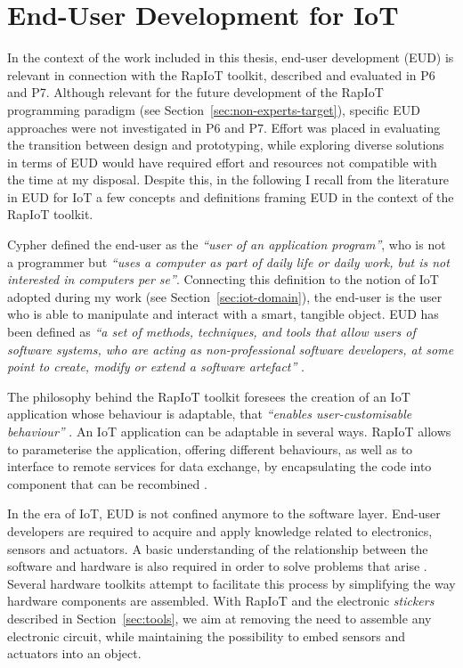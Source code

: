\section{End-User Development for IoT}

In the context of the work included in this thesis, end-user development (EUD) is relevant in connection with the RapIoT toolkit, described and evaluated in P6 and P7. Although relevant for the future development of the RapIoT programming paradigm (see Section~\ref{sec:non-experts-target}), specific EUD approaches were not investigated in P6 and P7. Effort was placed in evaluating the transition between design and prototyping, while exploring diverse solutions in terms of EUD would have required effort and resources not compatible with the time at my disposal.
Despite this, in the following I recall from the literature in EUD for IoT a few concepts and definitions framing EUD in the context of the RapIoT toolkit.

Cypher \autocite*{cypher_watch_1993} defined the end-user as the \textit{\enquote{user of an application program}}, who is not a programmer but \textit{\enquote{uses a computer as part of daily life or daily work, but is not interested in computers per se}}. Connecting this definition to the notion of IoT adopted during my work (see Section~\ref{sec:iot-domain}), the end-user is the user who is able to manipulate and interact with a smart, tangible object. EUD has been defined as \textit{\enquote{a set of methods, techniques, and tools that allow users of software systems, who are acting as non-professional software developers, at some point to create, modify or extend a software artefact}} \autocite{lieberman_end-user_2006}.

The philosophy behind the RapIoT toolkit foresees the creation of an IoT application whose behaviour is adaptable, that \textit{\enquote{enables user-customisable behaviour}} \autocite{trigg_adaptability_1987}. An IoT application can be adaptable in several ways. RapIoT allows to parameterise the application, offering different behaviours, as well as to interface to remote services for data exchange, by encapsulating the code into component that can be recombined \autocite{baldwin_design_2000}.

In the era of IoT, EUD is not confined anymore to the software layer. End-user developers are required to acquire and apply knowledge related to electronics, sensors and actuators. A basic understanding of the relationship between the software and hardware is also required in order to solve problems that arise \autocite{booth_crossed_2016}. Several hardware toolkits attempt to facilitate this process by simplifying the way hardware components are assembled. With RapIoT and the electronic \textit{stickers} described in Section~\ref{sec:tools}, we aim at removing the need to assemble any electronic circuit, while maintaining the possibility to embed sensors and actuators into an object.
